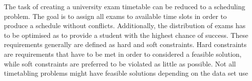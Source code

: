 




The task of creating a university exam timetable can be reduced to a scheduling problem. The goal is to assign all
exams to available time slots in order to produce a schedule without conflicts. Additionally, the distribution of exams
has to be optimised as to provide a student with the highest chance of success. These requirements generally are defined
as hard and soft constraints. Hard constraints are requirements that have to be met in order to considered a feasible
solution, while soft constraints are preferred to be violated as little as possible. Not all timetabling problems might have
feasible solutions depending on the data set use
